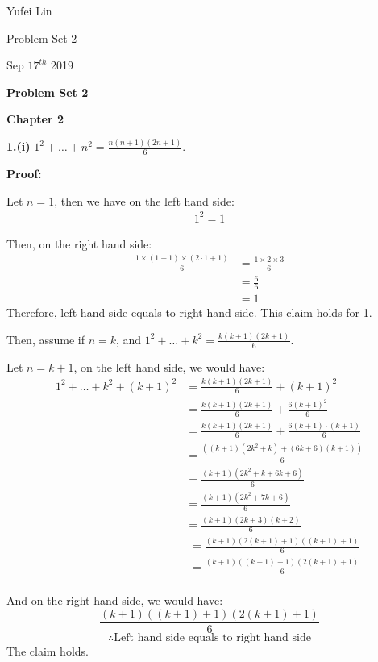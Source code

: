 \documentclass[a4paper,12pt]{report}
\begin{document}
\noindent
Yufei Lin

\noindent
Problem Set 2

\noindent
Sep \(17^{th}\) 2019

\begin{center}
\textbf{Problem Set 2}
\end{center}

\noindent
\textbf{Chapter 2}

\noindent
\textbf{1.(i)} $1^2+\dots+n^2=\frac{n(n+1)(2n+1)}{6}$.

\noindent
\textbf{Proof: }

\noindent
Let $n=1$, then we have on the left hand side:
\begin{align*}
1^2 = 1
\end{align*}

\noindent
Then, on the right hand side:
\begin{align*}
\frac{1\times (1+1)\times (2\cdot{1}+1)}{6} 
&= \frac{1\times 2\times 3}{6}\\
&=\frac{6}{6}\\
&=1
\end{align*}
\noindent
Therefore, left hand side equals to right hand side. This claim holds for 1.

\noindent
Then, assume if $n=k$, and $1^2+\dots+k^2=\frac{k(k+1)(2k+1)}{6}$.

Let $n=k+1$, on the left hand side, we would have:
\begin{align*}
1^2+\dots+k^2+(k+1)^2
&=\frac{k(k+1)(2k+1)}{6}+ (k+1)^2\\
&= \frac{k(k+1)(2k+1)}{6} + \frac{6(k+1)^2}{6}\\
&=\frac{k(k+1)(2k+1)}{6} + \frac{6(k+1)\cdot{(k+1)}}{6}\\
&=\frac{((k+1)(2k^2+k)+(6k+6)(k+1))}{6}\\
&=\frac{(k+1)(2k^2+k+6k+6)}{6}\\
&=\frac{(k+1)(2k^2+7k+6)}{6}\\
&=\frac{(k+1)(2k+3)(k+2)}{6}
\end{align*}
\begin{align*}
\phantom{1^2+\dots+k^2+(k+1)^2}
&=\frac{(k+1)(2(k+1)+1)((k+1)+1)}{6}\\
&=\frac{(k+1)((k+1)+1)(2(k+1)+1)}{6}\\
\end{align*}

\noindent
And on the right hand side, we would have:
\[\frac{(k+1)((k+1)+1)(2(k+1)+1)}{6}\]
\[\therefore \text{Left hand side equals to right hand side}\]
The claim holds. 
\end{document}
